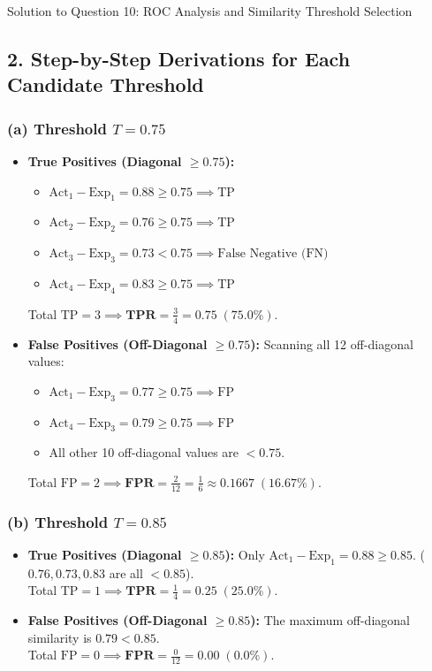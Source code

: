 \documentclass[11pt,a4paper]{article}
\begin{document}
\begin{solutionbox}{Solution to Question 10: ROC Analysis and Similarity Threshold Selection}
\subsection*{2. Step-by-Step Derivations for Each Candidate Threshold}

\subsubsection*{(a) Threshold $T = 0.75$}
\begin{itemize}[leftmargin=1.5em,itemsep=1pt]
    \item \textbf{True Positives (Diagonal $\ge 0.75$):}
    \begin{itemize}[leftmargin=1.2em]
        \item $\text{Act}_1 - \text{Exp}_1 = 0.88 \ge 0.75 \implies \text{TP}$
        \item $\text{Act}_2 - \text{Exp}_2 = 0.76 \ge 0.75 \implies \text{TP}$
        \item $\text{Act}_3 - \text{Exp}_3 = 0.73 < 0.75 \implies \text{False Negative (FN)}$
        \item $\text{Act}_4 - \text{Exp}_4 = 0.83 \ge 0.75 \implies \text{TP}$
    \end{itemize}
    Total $\text{TP} = 3 \implies \mathbf{TPR} = \frac{3}{4} = \mathbf{0.75} \; (75.0\%)$.
    
    \item \textbf{False Positives (Off-Diagonal $\ge 0.75$):}
    Scanning all 12 off-diagonal values:
    \begin{itemize}[leftmargin=1.2em]
        \item $\text{Act}_1 - \text{Exp}_3 = 0.77 \ge 0.75 \implies \text{FP}$
        \item $\text{Act}_4 - \text{Exp}_3 = 0.79 \ge 0.75 \implies \text{FP}$
        \item All other 10 off-diagonal values are $< 0.75$.
    \end{itemize}
    Total $\text{FP} = 2 \implies \mathbf{FPR} = \frac{2}{12} = \frac{1}{6} \approx \mathbf{0.1667} \; (16.67\%)$.
\end{itemize}

\subsubsection*{(b) Threshold $T = 0.85$}
\begin{itemize}[leftmargin=1.5em,itemsep=1pt]
    \item \textbf{True Positives (Diagonal $\ge 0.85$):}
    Only $\text{Act}_1 - \text{Exp}_1 = 0.88 \ge 0.85$. ($0.76, 0.73, 0.83$ are all $< 0.85$).\\
    Total $\text{TP} = 1 \implies \mathbf{TPR} = \frac{1}{4} = \mathbf{0.25} \; (25.0\%)$.
    \item \textbf{False Positives (Off-Diagonal $\ge 0.85$):}
    The maximum off-diagonal similarity is $0.79 < 0.85$.\\
    Total $\text{FP} = 0 \implies \mathbf{FPR} = \frac{0}{12} = \mathbf{0.00} \; (0.0\%)$.
\end{itemize}


\end{solutionbox}
\end{document}
